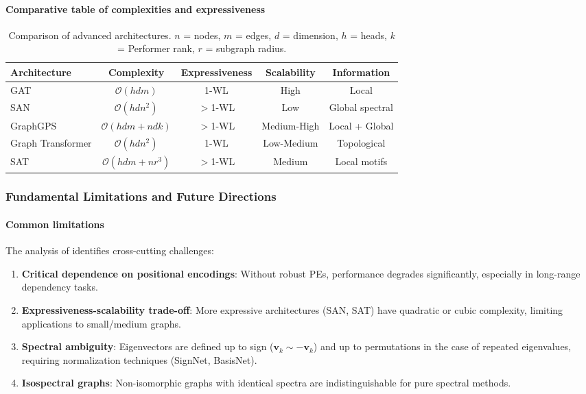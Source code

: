 \paragraph{Comparative table of complexities and expressiveness}

\begin{table}[h]
\centering
\small
\begin{tabular}{|l|c|c|c|c|}
\hline
\textbf{Architecture} & \textbf{Complexity} & \textbf{Expressiveness} & \textbf{Scalability} & \textbf{Information} \\
\hline
GAT & $\mathcal{O}(hdm)$ & 1-WL & High & Local \\
SAN & $\mathcal{O}(hdn^2)$ & $>$1-WL & Low & Global spectral \\
GraphGPS & $\mathcal{O}(hdm + ndk)$ & $>$1-WL & Medium-High & Local + Global \\
Graph Transformer & $\mathcal{O}(hdn^2)$ & 1-WL & Low-Medium & Topological \\
SAT & $\mathcal{O}(hdm + nr^3)$ & $>$1-WL & Medium & Local motifs \\
\hline
\end{tabular}
\caption[Comparison of advanced architectures]{Comparison of advanced architectures. $n$ = nodes, $m$ = edges, $d$ = dimension, $h$ = heads, $k$ = Performer rank, $r$ = subgraph radius.}
\label{tab:advanced_architectures_comparison}
\end{table}

\subsubsection{Fundamental Limitations and Future Directions}\label{subsubsec:limitations_future}

\paragraph{Common limitations}

The analysis of \citet{ying2021transformers} identifies cross-cutting challenges:

\begin{enumerate}
    \item \textbf{Critical dependence on positional encodings}: Without robust PEs, performance degrades significantly, especially in long-range dependency tasks.

    \item \textbf{Expressiveness-scalability trade-off}: More expressive architectures (SAN, SAT) have quadratic or cubic complexity, limiting applications to small/medium graphs.

    \item \textbf{Spectral ambiguity}: Eigenvectors are defined up to sign ($\mathbf{v}_k \sim -\mathbf{v}_k$) and up to permutations in the case of repeated eigenvalues, requiring normalization techniques (SignNet, BasisNet).

    \item \textbf{Isospectral graphs}: Non-isomorphic graphs with identical spectra are indistinguishable for pure spectral methods.
\end{enumerate}

